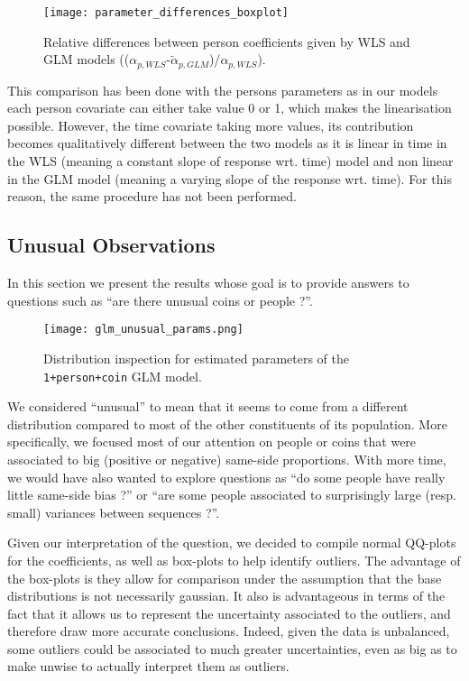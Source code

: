 \documentclass[a4paper, 12pt,oneside]{article}
\begin{document}
		\begin{figure}[htb]
			\vspace{-1em}
			\centering
			\texttt{[image: parameter\_differences\_boxplot]}
			\caption{Relative differences between person coefficients given by WLS and GLM models (($\alpha_{p,WLS}$-$\tilde{\alpha}_{p,GLM}$)/$\alpha_{p,WLS}$).}
			\label{fig:parameter_differences_boxplot}
		\end{figure}

		This comparison has been done with the persons parameters as in our models each person covariate can either take value 0 or 1, which makes the linearisation possible. However, the time covariate taking more values, its contribution becomes qualitatively different between the two models as it is linear in time in the WLS (meaning a constant slope of response wrt. time) model and non linear in the GLM model (meaning a varying slope of the response wrt. time). For this reason, the same procedure has not been performed. 



		\subsection{Unusual Observations}
		In this section we present the results whose goal is to provide answers to questions such as ``are there unusual coins or people ?''. 
		\begin{figure}[h!]%
			\centering
			\texttt{[image: glm\_unusual\_params.png]}
			\caption{Distribution inspection for estimated parameters of the \texttt{1+person+coin} GLM model.}
			\label{fig:unusual-params}
		\end{figure}

		We considered ``unusual'' to mean that it seems to come from a different distribution compared to most of the other constituents of its population. More specifically, we focused most of our attention on people or coins that were associated to big (positive or negative) same-side proportions.  
		With more time, we would have also wanted to explore questions as  ``do some people have really little same-side bias ?'' or ``are some people associated to surprisingly large (resp. small) variances between sequences ?''.

		Given our interpretation of the question, we decided to compile normal QQ-plots for the coefficients, as well as box-plots to help identify outliers. The advantage of the box-plots is they allow for comparison under the assumption that the base distributions is not necessarily gaussian. 
		It also is advantageous in terms of the fact that it allows us to represent the uncertainty associated to the outliers, and therefore draw more accurate conclusions. Indeed, given the data is unbalanced, some outliers could be associated to much greater uncertainties, even as big as to make unwise to actually interpret them as outliers. 
		
\end{document}
